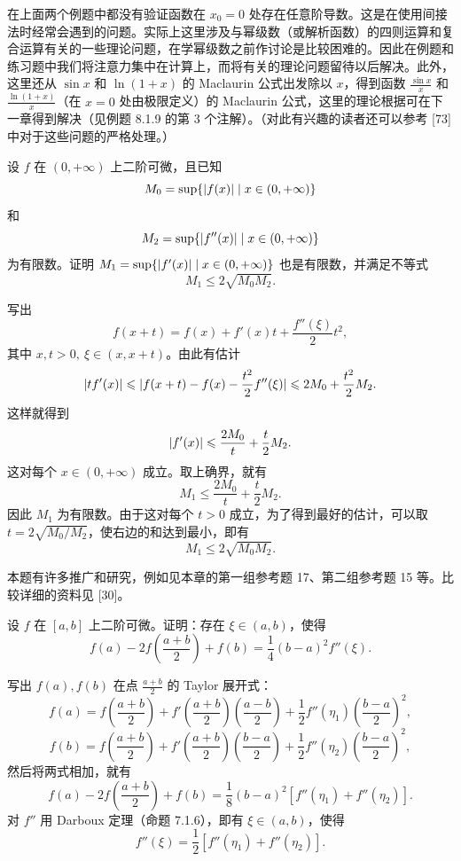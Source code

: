 \begin{xremark}
在上面两个例题中都没有验证函数在 $x_0=0$ 处存在任意阶导数。这是在使用间接法时经常会遇到的问题。实际上这里涉及与幂级数（或解析函数）的四则运算和复合运算有关的一些理论问题，在学幂级数之前作讨论是比较困难的。因此在例题和练习题中我们将注意力集中在计算上，而将有关的理论问题留待以后解决。此外，这里还从 $\sin x$ 和 $\ln(1+x)$ 的 Maclaurin 公式出发除以 $x$，得到函数 $\frac{\sin x}{x}$ 和 $\frac{\ln(1+x)}{x}$（在 $x=0$ 处由极限定义）的 Maclaurin 公式，这里的理论根据可在下一章得到解决（见例题 8.1.9 的第 3 个注解）。（对此有兴趣的读者还可以参考 [73] 中对于这些问题的严格处理。）
\end{xremark}

\begin{xexample}[7.2.5]
设 $f$ 在 $(0,+\infty)$ 上二阶可微，且已知
\[
  M_0=\sup\{\lvert f(x)\rvert\mid x\in(0,+\infty)\}
\]
和
\[
  M_2=\sup\{\lvert f''(x)\rvert\mid x\in(0,+\infty)\}
\]
为有限数。证明 $M_1=\sup\{\lvert f'(x)\rvert\mid x\in(0,+\infty)\}$ 也是有限数，并满足不等式
\[
  M_1\leqslant2\sqrt{M_0M_2}.
\]
\end{xexample}
\begin{xproof}
写出
\[
  f(x+t)=f(x)+f'(x)t+\frac{f''(\xi)}{2}t^2,
\]
其中 $x,t>0,\ \xi\in(x,x+t)$。由此有估计
\[
  \lvert tf'(x)\rvert\leqslant\lvert f(x+t)-f(x)-\frac{t^2}{2}f''(\xi)\rvert
  \leqslant2M_0+\frac{t^2}{2}M_2.
\]
这样就得到
\[
  \lvert f'(x)\rvert\leqslant\frac{2M_0}{t}+\frac{t}{2}M_2.
\]
这对每个 $x\in(0,+\infty)$ 成立。取上确界，就有
\begin{equation}
  M_1\leqslant\frac{2M_0}{t}+\frac{t}{2}M_2.
  \tag{7.24}
\end{equation}
因此 $M_1$ 为有限数。由于这对每个 $t>0$ 成立，为了得到最好的估计，可以取 $t=2\sqrt{M_0/M_2}$，使右边的和达到最小，即有
\[
  M_1\leqslant2\sqrt{M_0M_2}.
\]
\end{xproof}

\begin{xremark}
本题有许多推广和研究，例如见本章的第一组参考题 17、第二组参考题 15 等。比较详细的资料见 [30]。
\end{xremark}

\begin{xexample}[7.2.6]
设 $f$ 在 $[a,b]$ 上二阶可微。证明：存在 $\xi\in(a,b)$，使得
\[
  f(a)-2f\left(\frac{a+b}{2}\right)+f(b)=\frac14(b-a)^2f''(\xi).
\]
\end{xexample}
\begin{xproof}
写出 $f(a),f(b)$ 在点 $\frac{a+b}{2}$ 的 Taylor 展开式：
\[
  f(a)=f\left(\frac{a+b}{2}\right)
  +f'\left(\frac{a+b}{2}\right)\left(\frac{a-b}{2}\right)
  +\frac12f''(\eta_1)\left(\frac{b-a}{2}\right)^2,
\]
\[
  f(b)=f\left(\frac{a+b}{2}\right)
  +f'\left(\frac{a+b}{2}\right)\left(\frac{b-a}{2}\right)
  +\frac12f''(\eta_2)\left(\frac{b-a}{2}\right)^2,
\]
然后将两式相加，就有
\[
  f(a)-2f\left(\frac{a+b}{2}\right)+f(b)
  =\frac18(b-a)^2[f''(\eta_1)+f''(\eta_2)].
\]
对 $f''$ 用 Darboux 定理（命题 7.1.6），即有 $\xi\in(a,b)$，使得
\[
  f''(\xi)=\frac12[f''(\eta_1)+f''(\eta_2)].
\]
\end{xproof}

